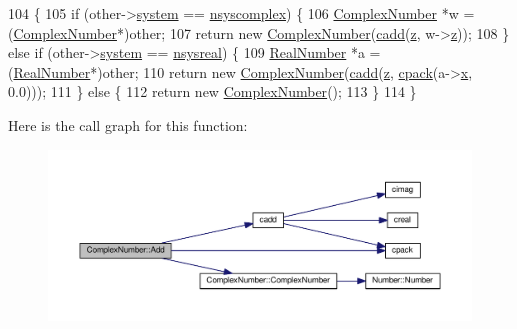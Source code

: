 \begin{DoxyCode}
104 \{
105     \textcolor{keywordflow}{if} (other->\hyperlink{structNumber_a2ceda5601c42288626e76b06878e7476}{system} == \hyperlink{numb_8h_a1475a201d2346881ce88dfbacf628c7da3b38c947375a3db3a4bc184a11c8ee42}{nsyscomplex}) \{
106         \hyperlink{structComplexNumber}{ComplexNumber} *w = (\hyperlink{structComplexNumber}{ComplexNumber}*)other;
107         \textcolor{keywordflow}{return} \textcolor{keyword}{new} \hyperlink{structComplexNumber_a610e9db9ff0ddb0140e30d235ab64e44}{ComplexNumber}(\hyperlink{complex_8h_a02d8fd1ce9c4fa4e25b1fa676ca96d4e}{cadd}(\hyperlink{structComplexNumber_a5f72da71f4ce0d88076a391369239042}{z}, w->\hyperlink{structComplexNumber_a5f72da71f4ce0d88076a391369239042}{z}));
108     \} \textcolor{keywordflow}{else}  \textcolor{keywordflow}{if} (other->\hyperlink{structNumber_a2ceda5601c42288626e76b06878e7476}{system} == \hyperlink{numb_8h_a1475a201d2346881ce88dfbacf628c7dae72cf8673109b15268d1c0837e8bff86}{nsysreal}) \{
109         \hyperlink{structRealNumber}{RealNumber} *a = (\hyperlink{structRealNumber}{RealNumber}*)other;
110         \textcolor{keywordflow}{return} \textcolor{keyword}{new} \hyperlink{structComplexNumber_a610e9db9ff0ddb0140e30d235ab64e44}{ComplexNumber}(\hyperlink{complex_8h_a02d8fd1ce9c4fa4e25b1fa676ca96d4e}{cadd}(\hyperlink{structComplexNumber_a5f72da71f4ce0d88076a391369239042}{z}, \hyperlink{complex_8h_a980e6e049f7902b05fc9eb5614b07a5c}{cpack}(a->\hyperlink{structRealNumber_ac33d80bee75448490199a0aa48ccce1e}{x}, 0.0)));
111     \} \textcolor{keywordflow}{else} \{
112         \textcolor{keywordflow}{return} \textcolor{keyword}{new} \hyperlink{structComplexNumber_a610e9db9ff0ddb0140e30d235ab64e44}{ComplexNumber}();
113     \}
114 \}
\end{DoxyCode}


Here is the call graph for this function\+:
\nopagebreak
\begin{figure}[H]
\begin{center}
\leavevmode
\includegraphics[width=350pt]{db/d8e/structComplexNumber_ad6b9fb6fe480c3a626f4e105024d2375_cgraph}
\end{center}
\end{figure}


